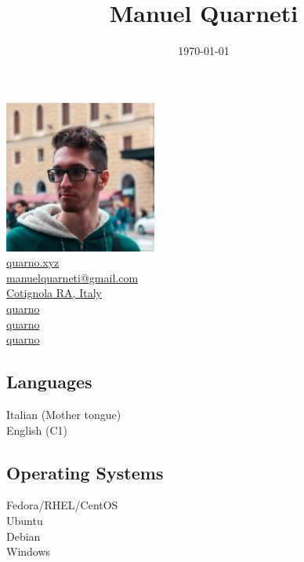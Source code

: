 \documentclass{article}
\title{\HUGE Manuel Quarneti \\[-20pt]}
\author{}
\date{\today}
\begin{document}
\setmainfont{Noto Sans}

\setlength{\columnsep}{2.2em}
\setlength{\columnseprule}{4pt}
\begin{paracol}{2}

\begin{center}
    \includegraphics[height=5cm]{me} \\[20pt]

    \href{https://quarno.xyz/}{ quarno.xyz} \\[8pt]
    \href{mailto:manuelquarneti@gmail.com}{ manuelquarneti@gmail.com} \\[8pt]
    \href{https://www.openstreetmap.org/relation/43112}{ Cotignola RA, Italy} \\[8pt]
    \href{https://github.com/quarno}{ quarno} \\[8pt]
    \href{https://www.linkedin.com/in/quarno}{ quarno} \\[8pt]
    \href{https://t.me/quarno}{ quarno}

    \vfill

    \subsection*{\center Languages}
     Italian (Mother tongue) \\[4pt]
     English (C1)

    \subsection*{\center Operating Systems}
     Fedora/RHEL/CentOS \\[4pt]
     Ubuntu \\[4pt]
     Debian \\[4pt]
     Windows


\end{center}
\end{paracol}
\end{document}
